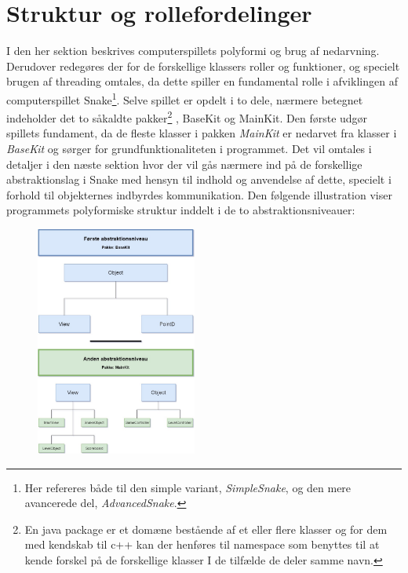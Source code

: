 \documentclass[]{article}
\begin{document}
\section{Struktur og rollefordelinger}

I den her sektion beskrives computerspillets polyformi og brug af nedarvning. Derudover redegøres der for de forskellige klassers roller og funktioner, og specielt brugen af threading omtales, da dette spiller en fundamental rolle i afviklingen af computerspillet Snake\footnote{Her refereres både til den simple variant, \textit{SimpleSnake}, og den mere avancerede del, \textit{AdvancedSnake}.}.
Selve spillet er opdelt i to dele, nærmere betegnet indeholder det to såkaldte pakker\footnote{En java package er et domæne bestående af et eller flere klasser og for dem med kendskab til c++ kan der henføres til namespace som benyttes til at kende forskel på de forskellige klasser I de tilfælde de deler samme navn.} , BaseKit og MainKit. Den første udgør spillets fundament, da de fleste klasser i pakken \textit{MainKit} er nedarvet fra klasser i \textit{BaseKit} og sørger for grundfunktionaliteten i programmet. Det vil omtales i detaljer i den næste sektion hvor der vil gås nærmere ind på de forskellige abstraktionslag i Snake med hensyn til indhold og anvendelse af dette, specielt i forhold til objekternes indbyrdes kommunikation. Den følgende illustration viser programmets polyformiske struktur inddelt i de to abstraktionsniveauer:

\begin{figure}[h!]
	\centering
	\includegraphics[width=200px]{Abstraktions_diagram.jpg}
	\label{fig:diagram}
\end{figure}
\end{document}
